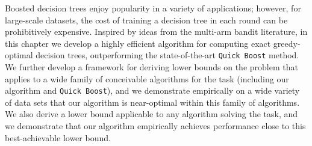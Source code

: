 
Boosted decision trees enjoy popularity in a variety of applications;
however, for large-scale datasets, the cost of training a decision
tree in each round can be prohibitively expensive.  Inspired by ideas
from the multi-arm bandit literature, in this chapter we develop a highly efficient
algorithm for computing exact greedy-optimal decision trees,
outperforming the state-of-the-art \texttt{Quick Boost} method.  We
further develop a framework for deriving lower bounds on the problem
that applies to a wide family of conceivable algorithms for the task
(including our algorithm and \texttt{Quick Boost}), and we demonstrate
empirically on a wide variety of data sets that our algorithm is
near-optimal within this family of algorithms.  We also
derive a lower bound applicable to any algorithm solving the task, and
we demonstrate that our algorithm empirically achieves performance
close to this best-achievable lower bound.

